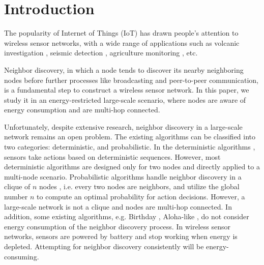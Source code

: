 \section{Introduction}








The popularity of Internet of Things (IoT) has drawn people's attention to wireless sensor networks\cite{akyildiz2002wireless}, with a wide range of applications such as volcanic investigation \cite{werner2006deploying}, seismic detection \cite{suzuki2007high}, agriculture monitoring \cite{wang2010l3sn}, etc. 

Neighbor discovery, in which a node tends to discover its nearby neighboring nodes before further processes like broadcasting and peer-to-peer communication, is a fundamental step to construct a wireless sensor network. In this paper, we study it in an energy-restricted large-scale scenario, where nodes are aware of energy consumption and  are multi-hop connected.

Unfortunately, despite extensive research, neighbor discovery in a large-scale network remains an open problem.
The existing algorithms can be classified into two categories: deterministic, and probabilistic.
In the deterministic algorithms \cite{dutta2008practical, kandhalu2010u, bakht2012searchlight, sun2014hello,  chen2015heterogeneous, qiu2016talk}, sensors take actions based on deterministic sequences.
However, most deterministic algorithms are designed only for two nodes and directly applied to a multi-node scenario. Probabilistic algorithms handle neighbor discovery in a clique of $n$ nodes\cite{mcglynn2001birthday, vasudevan2009neighbor, you2011aloha, song2014probabilistic} , i.e. every two nodes are neighbors, and utilize the global number $n$ to compute an optimal probability for action decisions. However, a large-scale network is not a clique and nodes are multi-hop connected. In addition, some existing algorithms, e.g. Birthday \cite{mcglynn2001birthday}, Aloha-like \cite{vasudevan2009neighbor}, do not consider energy consumption of the neighbor discovery process. In wireless sensor networks, sensors are powered by battery and stop working when energy is  depleted. Attempting for neighbor discovery consistently will be energy-consuming. 

